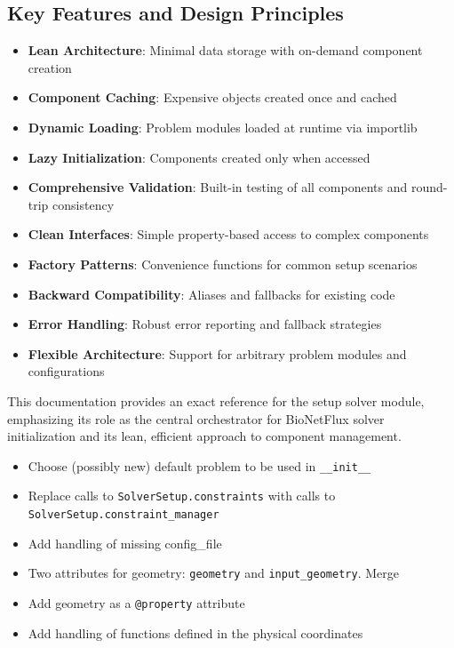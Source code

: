 \subsection{Key Features and Design Principles}

\begin{itemize}
    \item \textbf{Lean Architecture}: Minimal data storage with on-demand component creation
    \item \textbf{Component Caching}: Expensive objects created once and cached
    \item \textbf{Dynamic Loading}: Problem modules loaded at runtime via importlib
    \item \textbf{Lazy Initialization}: Components created only when accessed
    \item \textbf{Comprehensive Validation}: Built-in testing of all components and round-trip consistency
    \item \textbf{Clean Interfaces}: Simple property-based access to complex components
    \item \textbf{Factory Patterns}: Convenience functions for common setup scenarios
    \item \textbf{Backward Compatibility}: Aliases and fallbacks for existing code
    \item \textbf{Error Handling}: Robust error reporting and fallback strategies
    \item \textbf{Flexible Architecture}: Support for arbitrary problem modules and configurations
\end{itemize}

This documentation provides an exact reference for the setup solver module, emphasizing its role as the central orchestrator for BioNetFlux solver initialization and its lean, efficient approach to component management.

\begin{todobox}
	\begin{itemize}
		\item {Choose (possibly new) default problem to be used in {\tt \_\_init\_\_}}
		\item Replace calls to {\tt SolverSetup.constraints} with calls to {\tt SolverSetup.constraint\_manager}
		\item Add handling of missing config\_file
		\item Two attributes for geometry: {\tt geometry} and {\tt input\_geometry}. Merge
		\item Add geometry as a {\tt @property} attribute
		\item Add handling of functions defined in the physical coordinates
	\end{itemize}
\end{todobox}


